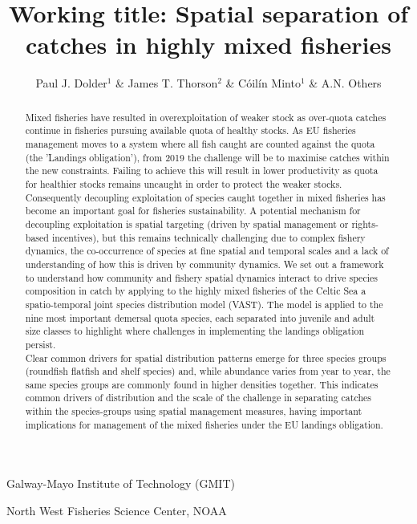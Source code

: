 \documentclass{nature}
\title{Working title: Spatial separation of catches in highly mixed fisheries}
\author{Paul J. Dolder$^1$ \& James T. Thorson$^2$ \& Cóilín Minto$^1$ \& A.N.
Others}
\begin{document}
\maketitle

\begin{affiliations}
\item Galway-Mayo Institute of Technology (GMIT) 
\item North West Fisheries Science Center, NOAA
\end{affiliations}

\begin{linenumbers}

\begin{abstract} 
Mixed fisheries have resulted in overexploitation of weaker stock as over-quota
catches continue in fisheries pursuing available quota of healthy stocks. As EU
fisheries management moves to a system where all fish caught are counted
against the quota (the 'Landings obligation'), from 2019 the challenge will be
to maximise catches within the new constraints. Failing to achieve this will
result in lower productivity as quota for healthier stocks remains uncaught in
order to protect the weaker stocks. Consequently decoupling exploitation of
species caught together in mixed fisheries has become an important goal for
fisheries sustainability. A potential mechanism for decoupling exploitation is
spatial targeting (driven by spatial management or rights-based incentives),
but this remains technically challenging due to complex fishery dynamics, the
co-occurrence of species at fine spatial and temporal scales and a lack of
understanding of how this is driven by community dynamics.  We set out a
framework to understand how community and fishery spatial dynamics interact to
drive species composition in catch by applying to the highly mixed fisheries of
the Celtic Sea a spatio-temporal joint species distribution model (VAST). The
model is applied to the nine most important demersal quota species, each
separated into juvenile and adult size classes to highlight where challenges in
implementing the landings obligation persist.  \\

Clear common drivers for spatial distribution patterns emerge for three species
groups (roundfish flatfish and shelf species) and, while abundance varies from
year to year, the same species groups are commonly found in higher densities
together. This indicates common drivers of distribution and the scale of the
challenge in separating catches within the species-groups using spatial
management measures, having important implications for management of the mixed
fisheries under the EU landings obligation.


\end{abstract}
\end{linenumbers}
\end{document}
